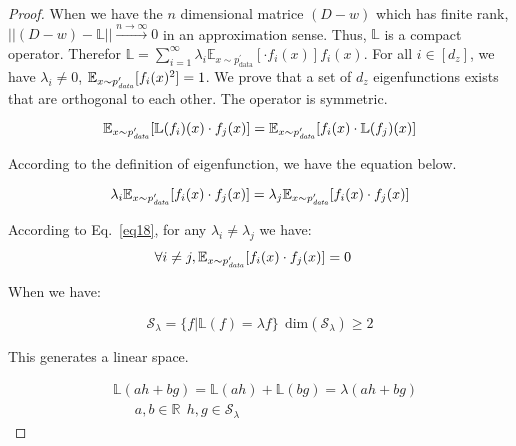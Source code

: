 \begin{proof}



When we have the $n$ dimensional matrice $(D-w)$ which has finite rank, $||(D-w) - \mathbb{L}|| \xrightarrow{n \to \infty} 0 $ in an approximation sense. Thus, $\mathbb{L}$ is a compact operator. Therefor $\mathbb{L}=\sum_{i=1}^\infty \lambda_i \mathbb{E}_{x\sim p_{\text{data}}^\prime}[\cdot f_i(x)] f_i(x)$. For all $i \in [d_z] $, we have $\lambda_i \neq 0 $,  $ \mathbb{E}_{x \sim p_{\text{\textit{data}}}^\prime}[f_i(x)^2] = 1$. We prove that a set of $d_z$ eigenfunctions exists that are orthogonal to each other. The operator is symmetric.

\begin{equation}\label{eq:symetric}
    \mathbb{E}_{x \sim p_{\text{\textit{data}}}^\prime}[\mathbb{L}(f_i)(x) \cdot f_j(x)] = \mathbb{E}_{x \sim p_{\text{\textit{data}}}^\prime}[f_i(x) \cdot \mathbb{L}(f_j)(x)]
\end{equation}


According to the definition of eigenfunction, we have the equation below.

\begin{equation}\label{eq18}
    \lambda_i \mathbb{E}_{x \sim p_{\text{\textit{data}}}^\prime}[f_i(x) \cdot f_j(x)] =  \lambda_j \mathbb{E}_{x \sim p_{\text{\textit{data}}}^\prime}[f_i(x) \cdot f_j(x)]
\end{equation}

According to Eq.~\ref{eq18}, for any $\lambda_i \neq \lambda_j$ we have:
\begin{equation}
\begin{aligned}
     &   \forall i\neq j, \mathbb{E}_{x \sim p_{\text{\textit{data}}}^\prime}[f_i(x) \cdot f_j(x)] = 0
\end{aligned}
\end{equation}

When we have:

\begin{equation}
    \mathcal{S}_{\lambda} = \{f | \mathbb{L}(f)=\lambda f\} \ \ \text{dim}(\mathcal{S}_{\lambda}) \geq 2
\end{equation}

This generates a linear space.

\begin{equation}
\begin{aligned}
    & \mathbb{L}(ah + bg) = \mathbb{L}(ah) + \mathbb{L}(bg) = \lambda(ah + bg)  \\
    & \ \ \ \ \ \ \  a,b\in \mathbb{R} \ \ h,g \in \mathcal{S}_{\lambda} 
\end{aligned}
\end{equation}


\end{proof}
